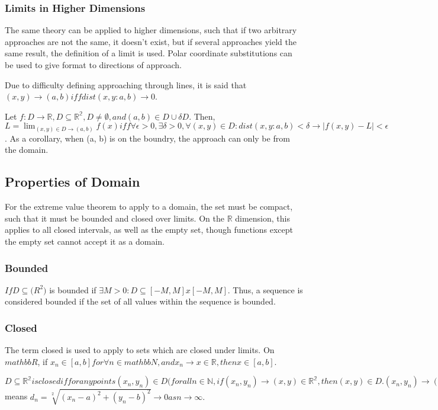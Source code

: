 \subsubsection{Limits in Higher Dimensions}
The same theory can be applied to higher dimensions, such that if two arbitrary approaches are not the same, it doesn't exist, but if several approaches yield the same result, the definition of a limit is used. Polar coordinate substitutions can be used to give format to directions of approach.

Due to difficulty defining approaching through lines, it is said that $(x, y) \to (a, b) iff dist(x, y: a, b) \to 0$.

Let $f: D \to \mathbb{R}, D \subseteq \mathbb{R^2}, D \neq \emptyset, and (a, b) \in D \cup \delta D.$ Then, $L = \lim_{(x, y) \in D \to (a,b)} f(x) iff \forall \epsilon > 0, \exists \delta > 0, \forall (x, y) \in D: dist(x, y: a, b) < \delta \to |f(x, y) - L| < \epsilon$. As a corollary, when (a, b) is on the boundry, the approach can only be from the domain.

\subsection{Properties of Domain}
For the extreme value theorem to apply to a domain, the set must be compact, such that it must be bounded and closed over limits. On the $\mathbb{R}$ dimension, this applies to all closed intervals, as well as the empty set, though functions except the empty set cannot accept it as a domain.

\subsubsection{Bounded}
$If D \subseteq \mathbb(R^2)$ is bounded if $\exists M > 0: D \subseteq [-M, M] x [-M, M]$. Thus, a sequence is considered bounded if the set of all values within the sequence is bounded.

\subsubsection{Closed}
The term closed is used to apply to sets which are closed under limits. On $mathbb{R}$, if $x_n \in [a, b] for \forall n \in mathbb{N}, and x_n \to x \in \mathbb{R}, then x \in [a, b]$.

$D \subseteq \mathbb{R^2} is closed if for any points (x_n, y_n) \in D (for all n \in \mathbb{N}, if (x_n, y_n) \to (x, y) \in \mathbb{R^2}, then (x, y) \in D. (x_n, y_n) \to (a, b) as n \to \infty$ means $d_n = \sqrt[2]{(x_n - a)^2 + (y_n - b)^2} \to 0 as n \to \infty.$


